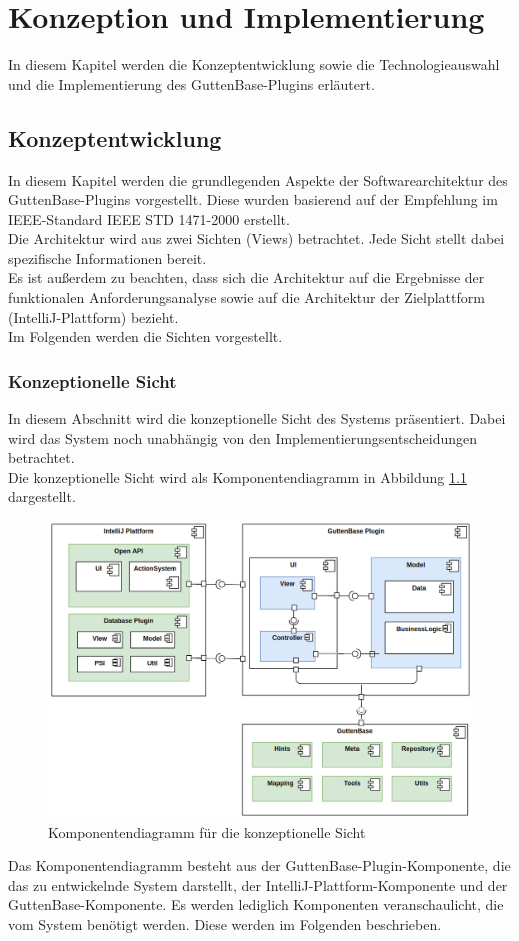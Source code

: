 \chapter{Konzeption und Implementierung}
\label{sec:kzimp}
In diesem Kapitel werden die Konzeptentwicklung sowie die Technologieauswahl und die Implementierung des GuttenBase-Plugins erläutert.
\section{Konzeptentwicklung}
	
	In diesem Kapitel werden die grundlegenden Aspekte der Softwarearchitektur des GuttenBase-Plugins vorgestellt. Diese wurden basierend auf der Empfehlung im IEEE-Standard IEEE STD 1471-2000 erstellt.\\
	Die Architektur wird aus zwei Sichten (Views) betrachtet. Jede Sicht stellt dabei spezifische Informationen bereit.\\
	Es ist außerdem zu beachten, dass sich die Architektur auf die Ergebnisse der funktionalen Anforderungsanalyse sowie auf die Architektur der Zielplattform (IntelliJ-Plattform) bezieht.\\
	Im Folgenden werden die Sichten vorgestellt.

	\subsection{Konzeptionelle Sicht}
	In diesem Abschnitt wird die konzeptionelle Sicht des Systems präsentiert. Dabei wird das System noch unabhängig von den Implementierungsentscheidungen betrachtet. \\
	Die konzeptionelle Sicht wird als Komponentendiagramm in Abbildung \ref{img:component-diagram} dargestellt. 
	\begin{figure}[H]
		\centering
		\includegraphics[width=\textwidth]{images/sichten/component-diagram}
		\caption{Komponentendiagramm für die konzeptionelle Sicht}
		\label{img:component-diagram}
	\end{figure}
	Das Komponentendiagramm besteht aus der GuttenBase-Plugin-Komponente, die das zu entwickelnde System darstellt, der IntelliJ-Plattform-Komponente und der GuttenBase-Komponente. Es werden lediglich Komponenten veranschaulicht, die vom System benötigt werden.	Diese werden im Folgenden beschrieben.
	
